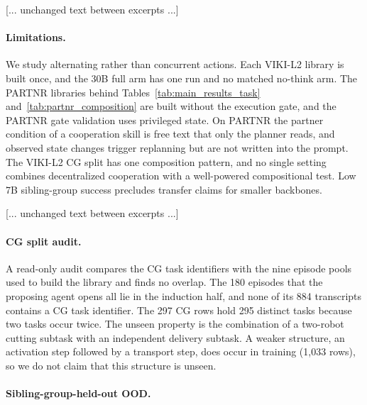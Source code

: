 [... unchanged text between excerpts ...]

\paragraph{Limitations.} We study alternating rather than concurrent actions. Each VIKI-L2 library is built once, and the 30B full arm has one run and no matched no-think arm. The PARTNR libraries behind Tables~\ref{tab:main_results_task} and~\ref{tab:partnr_composition} are built without the execution gate, and the PARTNR gate validation uses privileged state. On PARTNR the partner condition of a cooperation skill is free text that only the planner reads, and observed state changes trigger replanning but are not written into the prompt. The VIKI-L2 CG split has one composition pattern, and no single setting combines decentralized cooperation with a well-powered compositional test. Low 7B sibling-group success precludes transfer claims for smaller backbones.

[... unchanged text between excerpts ...]

\paragraph{CG split audit.}
A read-only audit compares the CG task identifiers with the nine episode pools used to build the library and finds no overlap. The 180 episodes that the proposing agent opens all lie in the induction half, and none of its 884 transcripts contains a CG task identifier. The 297 CG rows hold 295 distinct tasks because two tasks occur twice. The unseen property is the combination of a two-robot cutting subtask with an independent delivery subtask. A weaker structure, an activation step followed by a transport step, does occur in training (1{,}033 rows), so we do not claim that this structure is unseen.

\paragraph{Sibling-group-held-out OOD.}
